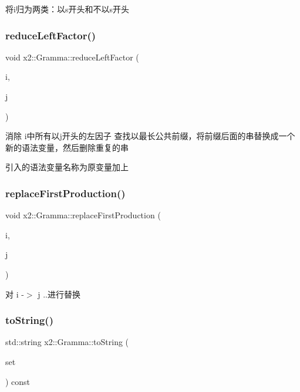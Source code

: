 将i归为两类：以s开头和不以s开头 \mbox{\label{classx2_1_1_gramma_a15e7c86a1dae673945a108f1bf2fb80c}} 
\subsubsection{\texorpdfstring{reduce\+Left\+Factor()}{reduceLeftFactor()}}
{\footnotesize\ttfamily void x2\+::\+Gramma\+::reduce\+Left\+Factor (\begin{DoxyParamCaption}\item[{int}]{i,  }\item[{int}]{j }\end{DoxyParamCaption})}

消除 i中所有以j开头的左因子 查找以最长公共前缀，将前缀后面的串替换成一个新的语法变量，然后删除重复的串

引入的语法变量名称为原变量加上\textquotesingle{} \mbox{\label{classx2_1_1_gramma_aa5e24a49dbf499af546703b594ef4a51}} 
\subsubsection{\texorpdfstring{replace\+First\+Production()}{replaceFirstProduction()}}
{\footnotesize\ttfamily void x2\+::\+Gramma\+::replace\+First\+Production (\begin{DoxyParamCaption}\item[{int}]{i,  }\item[{const int}]{j }\end{DoxyParamCaption})}

对 i -\/$>$ j ..进行替换 \mbox{\label{classx2_1_1_gramma_a04fc8a9d7e0dcc709706ac9bc117fb35}} 
\subsubsection{\texorpdfstring{to\+String()}{toString()}}
{\footnotesize\ttfamily std\+::string x2\+::\+Gramma\+::to\+String (\begin{DoxyParamCaption}\item[{const Sets\+Type \&}]{set }\end{DoxyParamCaption}) const}

